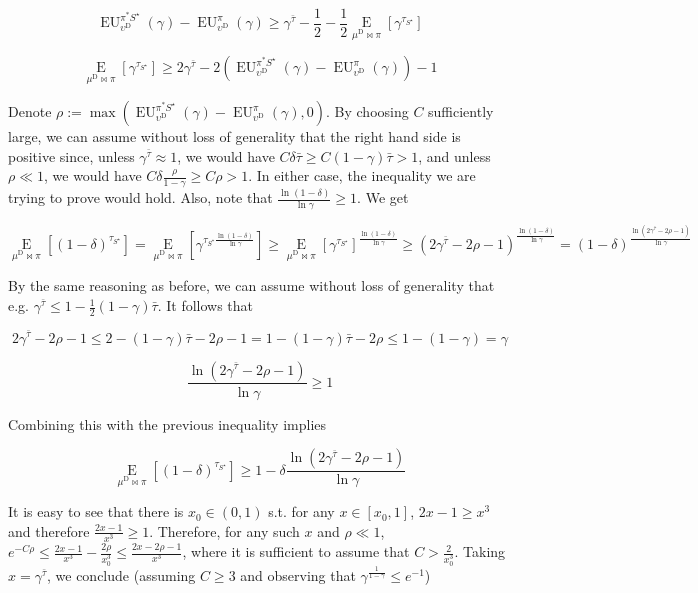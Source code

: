 \documentclass[a4paper]{article}
\newcommand{\AP}[1]{\left(#1\right)}
\newcommand{\AB}[1]{\left[#1\right]}
\newcommand{\Ea}[2]{\underset{#1}{\operatorname{E}}\AB{#2}}
\newcommand{\RMD}{\mathrm{D}}
\newcommand{\UD}{\upsilon^{\RMD}}
\newcommand{\EU}{\operatorname{EU}}
\begin{document}
$$\EU_{\UD}^{\pi^*S^\star}(\gamma) - \EU_{\UD}^\pi(\gamma) \geq \gamma^{\bar{\tau}} - \frac{1}{2} - \frac{1}{2}\Ea{\mu^\RMD\bowtie\pi}{\gamma^{\tau_{S^\star}}}$$

$$\Ea{\mu^\RMD\bowtie\pi}{\gamma^{\tau_{S^\star}}} \geq 2\gamma^{\bar{\tau}} - 2\AP{\EU_{\UD}^{\pi^*S^\star}(\gamma) - \EU_{\UD}^\pi(\gamma)}-1$$

Denote $\rho := \max\AP{\EU_{\UD}^{\pi^*S^\star}(\gamma) - \EU_{\UD}^\pi(\gamma),0}$.  By choosing $C$ sufficiently large, we can assume without loss of generality that the right hand side is positive since, unless $\gamma^{\bar{\tau}} \approx 1$, we would have $C\delta\bar{\tau} \geq C(1-\gamma)\bar{\tau} > 1$, and unless $\rho \ll 1$, we would have $C\delta\frac{\rho}{1-\gamma} \geq C\rho > 1$. In either case, the inequality we are trying to prove would hold. Also, note that $\frac{\ln{(1-\delta)}}{\ln{\gamma}} \geq 1$. We get

$$\Ea{\mu^\RMD\bowtie\pi}{(1-\delta)^{\tau_{S^\star}}}=\Ea{\mu^\RMD\bowtie\pi}{\gamma^{\tau_{S^\star}\frac{\ln{(1-\delta)}}{\ln{\gamma}}}} \geq \Ea{\mu^\RMD\bowtie\pi}{\gamma^{\tau_{S^\star}}}^{\frac{\ln{(1-\delta)}}{\ln{\gamma}}} \geq \AP{2\gamma^{\bar{\tau}}-2\rho-1}^{\frac{\ln{(1-\delta)}}{\ln{\gamma}}}=(1-\delta)^{\frac{\ln{\AP{2\gamma^{\bar{\tau}}-2\rho-1}}}{\ln{\gamma}}}$$

By the same reasoning as before, we can assume without loss of generality that e.g. $\gamma^{\bar{\tau}} \leq 1 - \frac{1}{2}(1-\gamma)\bar{\tau}$. It follows that

$$2\gamma^{\bar{\tau}}-2\rho-1 \leq 2 - (1 - \gamma)\bar{\tau} - 2\rho - 1 = 1 - (1 - \gamma)\bar{\tau} - 2\rho \leq 1 - (1-\gamma) = \gamma$$

$$\frac{\ln{\AP{2\gamma^{\bar{\tau}}-2\rho-1}}}{\ln{\gamma}} \geq 1$$

Combining this with the previous inequality implies

$$\Ea{\mu^\RMD\bowtie\pi}{(1-\delta)^{\tau_{S^\star}}} \geq 1 - \delta \frac{\ln{\AP{2\gamma^{\bar{\tau}}-2\rho-1}}}{\ln{\gamma}}$$

It is easy to see that there is $x_0 \in (0,1)$ s.t. for any $x \in [x_0,1]$, $2x -1 \geq x^3$ and therefore $\frac{2x-1}{x^3} \geq 1$. Therefore, for any such $x$ and $\rho \ll 1$, $e^{-C\rho}\leq\frac{2x - 1}{x^3} - \frac{2\rho}{x_0^3}\leq\frac{2x - 2\rho - 1}{x^3}$, where it is sufficient to assume that $C > \frac{2}{x_0^3}$. Taking $x=\gamma^{\bar{\tau}}$, we conclude (assuming $C \geq 3$ and observing that $\gamma^{\frac{1}{1-\gamma}}\leq e^{-1}$)
\end{document}
